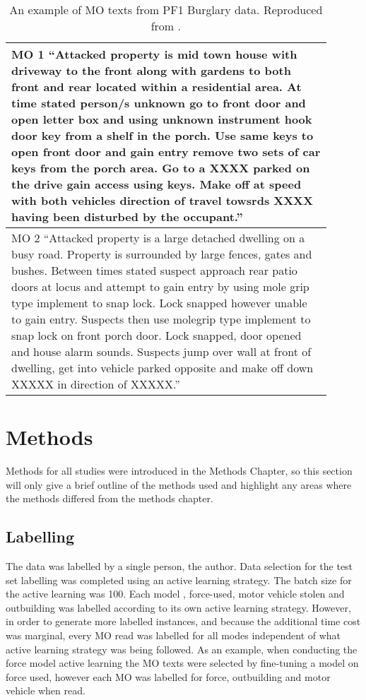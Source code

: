 \begin{table}[]
\begin{tabular}{p{0.9\linewidth}}
\toprule
MO 1 “Attacked property is mid town house with driveway to the front along with gardens to both front and rear located within a residential area. At time stated person/s unknown go to front door and open letter box and using unknown instrument hook door key from a shelf in the porch. Use same keys to open front door and gain entry remove two sets of car keys from the porch area. Go to a XXXX parked on the drive gain access using keys. Make off at speed with both vehicles direction of travel towsrds XXXX having been disturbed by the occupant.”             \\ \midrule
MO 2 “Attacked property is a large detached dwelling on a busy road. Property is surrounded by large fences, gates and bushes. Between times stated suspect approach rear patio doors at locus and attempt to gain entry by using mole grip type implement to snap lock. Lock snapped however unable to gain entry. Suspects then use molegrip type implement to snap lock on front porch door. Lock snapped, door opened and house alarm sounds. Suspects jump over wall at front of dwelling, get into vehicle parked opposite and make off down XXXXX in direction of XXXXX.” \\ \bottomrule
\end{tabular}
\caption[Example MO texts]{\label{tab:MOexample} An example of MO texts from PF1 Burglary data. Reproduced from \cite{birks}.}
\end{table}


\section{Methods} Methods for all studies were introduced in the Methods Chapter, so this section will only give a brief outline of the methods used and highlight any areas where the methods differed from the methods chapter.

\subsection{Labelling} The data was labelled by a single person, the author. Data selection for the test set labelling was completed using an active learning strategy. The batch size for the active learning was 100. Each model , force-used, motor vehicle stolen and outbuilding was labelled according to its own active learning strategy. However, in order to generate more labelled instances, and because the additional time cost was marginal, every MO read was labelled for all modes independent of what active learning strategy was being followed. As an example, when conducting the force model active learning the MO texts were selected by fine-tuning a model on force used, however each MO was labelled for force, outbuilding and motor vehicle when read.

